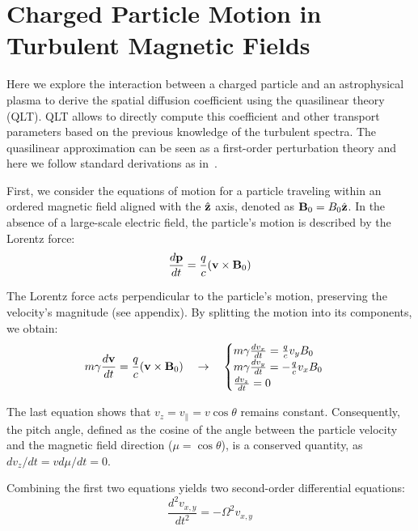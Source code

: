 \section{Charged Particle Motion in Turbulent Magnetic Fields}
\label{app:diffusioncoefficient}

Here we explore the interaction between a charged particle and an astrophysical plasma to derive the spatial diffusion coefficient using the quasilinear theory (QLT). 
%
QLT allows to directly compute this coefficient and other transport parameters based on the previous knowledge of the turbulent spectra.
%
The quasilinear approximation can be seen as a first-order perturbation theory and here we follow standard derivations as in~\cite{Blandford1987pr,Shalchi2009book,Blasi2013aar}.

First, we consider the equations of motion for a particle traveling within an ordered magnetic field aligned with the $\hat{\vb z}$ axis, denoted as $\vb B_0 = B_0 \hat{\vb z}$. In the absence of a large-scale electric field, the particle's motion is described by the Lorentz force:
%
\begin{equation}
\frac{d \vb p}{dt} = \frac{q}{c} (\vb v \times \vb B_0)
\label{eq:lorentz}
\end{equation}

The Lorentz force acts perpendicular to the particle's motion, preserving the velocity's magnitude (see appendix). By splitting the motion into its components, we obtain:
%
\begin{equation}
m \gamma \frac{d \vb v}{dt} = \frac{q}{c} (\vb v \times \vb B_0) \quad \rightarrow \quad 
\begin{cases}
m \gamma \frac{dv_x}{dt} = \frac{q}{c} v_y B_0 \\
m \gamma \frac{dv_y}{dt} = -\frac{q}{c} v_x B_0\\
\frac{dv_z}{dt} = 0
\end{cases}
\label{eq:lorentzcomponents}
\end{equation}

The last equation shows that $v_z = v_\| = v \cos \theta$ remains constant. Consequently, the pitch angle, defined as the cosine of the angle between the particle velocity and the magnetic field direction ($\mu = \cos \theta$), is a conserved quantity, as $dv_z/dt = v d\mu/dt = 0$.

Combining the first two equations yields two second-order differential equations:
%
\begin{equation}
\frac{d^2 v_{x,y}}{dt^2} = - \Omega^2 v_{x,y}
\end{equation}


